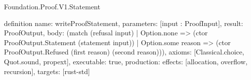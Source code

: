 \begin{lexlean}{Foundation.Proof.V1.Statement}
\begin{semanticmodule}
definition{
  name: writeProofStatement,
  parameters: [input : ProofInput],
  result: ProofOutput,
  body: (match (refusal input)
    | Option.none => (ctor ProofOutput.Statement (statement input))
    | Option.some reason => (ctor ProofOutput.Refused (first reason) (second reason))),
  axioms: [Classical.choice, Quot.sound, propext],
  executable: true,
  production: {effects: [allocation, overflow, recursion], targets: [rust-std]}
}
\end{semanticmodule}
\end{lexlean}
